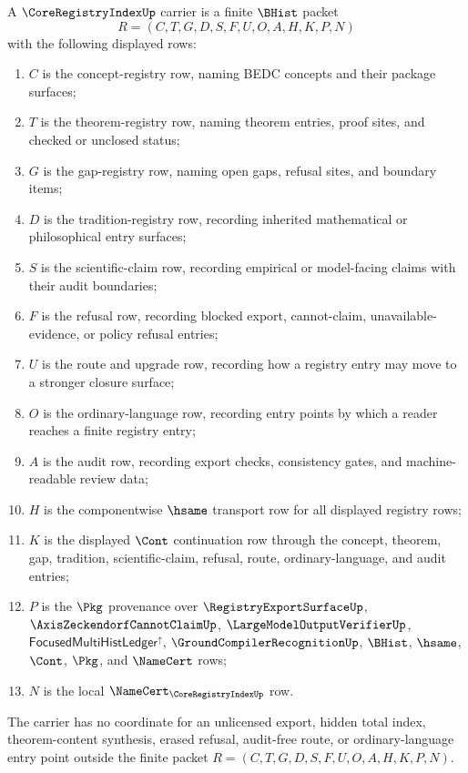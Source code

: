\begin{definition}
\label{def:core-registry-index-carrier}
A $\CoreRegistryIndexUp$ carrier is a finite $\BHist$ packet
$$
R=(C,T,G,D,S,F,U,O,A,H,K,P,N)
$$
with the following displayed rows:
\begin{enumerate}
\item $C$ is the concept-registry row, naming BEDC concepts and their package surfaces;
\item $T$ is the theorem-registry row, naming theorem entries, proof sites, and checked or unclosed status;
\item $G$ is the gap-registry row, naming open gaps, refusal sites, and boundary items;
\item $D$ is the tradition-registry row, recording inherited mathematical or philosophical entry surfaces;
\item $S$ is the scientific-claim row, recording empirical or model-facing claims with their audit boundaries;
\item $F$ is the refusal row, recording blocked export, cannot-claim, unavailable-evidence, or policy refusal entries;
\item $U$ is the route and upgrade row, recording how a registry entry may move to a stronger closure surface;
\item $O$ is the ordinary-language row, recording entry points by which a reader reaches a finite registry entry;
\item $A$ is the audit row, recording export checks, consistency gates, and machine-readable review data;
\item $H$ is the componentwise $\hsame$ transport row for all displayed registry rows;
\item $K$ is the displayed $\Cont$ continuation row through the concept, theorem, gap, tradition, scientific-claim, refusal, route, ordinary-language, and audit entries;
\item $P$ is the $\Pkg$ provenance over $\RegistryExportSurfaceUp$, $\AxisZeckendorfCannotClaimUp$, $\LargeModelOutputVerifierUp$, $\mathsf{FocusedMultiHistLedger}^{\uparrow}$, $\GroundCompilerRecognitionUp$, $\BHist$, $\hsame$, $\Cont$, $\Pkg$, and $\NameCert$ rows;
\item $N$ is the local $\NameCert_{\CoreRegistryIndexUp}$ row.
\end{enumerate}
The carrier has no coordinate for an unlicensed export, hidden total index, theorem-content synthesis, erased refusal, audit-free route, or ordinary-language entry point outside the finite packet $R=(C,T,G,D,S,F,U,O,A,H,K,P,N)$.
\end{definition}

